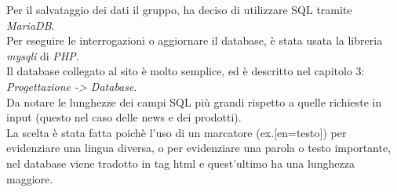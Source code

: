 ﻿Per il salvataggio dei dati il gruppo, ha deciso di utilizzare SQL tramite \emph{MariaDB}.\\
Per eseguire le interrogazioni o aggiornare il database, è stata usata la libreria \emph{mysqli} di \emph{PHP}.\\
Il database collegato al sito è molto semplice, ed è descritto nel capitolo 3: \emph{Progettazione -> Database}.
\\
Da notare le lunghezze dei campi SQL più grandi rispetto a quelle richieste in input (questo nel caso delle news e dei prodotti).\\
La scelta è stata fatta poichè l'uso di un marcatore (ex.[en=testo]) per evidenziare una lingua diversa, o per evidenziare una parola o testo importante,
nel database viene tradotto in tag html e quest'ultimo ha una lunghezza maggiore.
